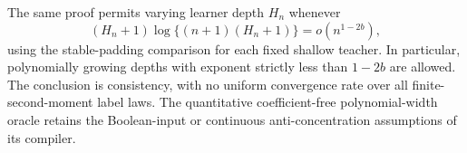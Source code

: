 The same proof permits varying learner depth $H_n$ whenever
\[
 (H_n+1)\log\{(n+1)(H_n+1)\}=o(n^{1-2b}),
\]
using the stable-padding comparison for each fixed shallow teacher.
In particular, polynomially growing depths with exponent strictly
less than $1-2b$ are allowed. The conclusion is consistency, with no
uniform convergence rate over all finite-second-moment label laws.
The quantitative coefficient-free polynomial-width oracle retains
the Boolean-input or continuous anti-concentration assumptions of
its compiler.
